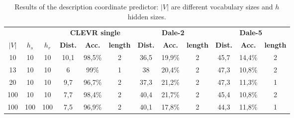 \begin{table}[h]
    \centering
    \begin{tabular}{ccc|ccc|ccc|ccc}
        \toprule
              &         &         & \multicolumn{3}{c}{\textbf{CLEVR single}} & \multicolumn{3}{c}{\textbf{Dale-2}} & \multicolumn{3}{c}{\textbf{Dale-5}}                                                                                                       \\\cmidrule(lr){4-6}\cmidrule(lr){7-9}\cmidrule(lr){10-12}
        $|V|$ & $h_{s}$ & $h_{r}$ & \textbf{Dist.}                            & \textbf{Acc.}                       & \textbf{length}                     & \textbf{Dist.} & \textbf{Acc.} & \textbf{length} & \textbf{Dist.} & \textbf{Acc.} & \textbf{length} \\\midrule
        {10}  & {10}    & {10}    & {10,1}                                    & {98,5\%}                            & {2}                                 & {36,5}         & {19,9\%}      & {2}             & {45,7}         & {14,4\%}      & {2}             \\
        {13}  & {10}    & {10}    & {6}                                       & {99\%}                              & {1}                                 & {38}           & {20,4\%}      & {2}             & {47,3}         & {10,8\%}      & {2}             \\
        {20}  & {10}    & {10}    & {9,7}                                     & {96,7\%}                            & {2}                                 & {37,3}         & {21,2\%}      & {2}             & {47,3}         & {11,3\%}      & {1}             \\
        {100} & {10}    & {10}    & {7,7}                                     & {98,4\%}                            & {2}                                 & {40,4}         & {21,7\%}      & {2}             & {45,4}         & {10,8\%}      & {2}             \\
        {100} & {100}   & {100}   & {7,5}                                     & {96,9\%}                            & {2}                                 & {40,1}         & {17,8\%}      & {2}             & {44,3}         & {11,8\%}      & {1}             \\
        \bottomrule
    \end{tabular}
    \caption{Results of the description coordinate predictor: $|V|$ are different vocabulary sizes and $h$ hidden sizes.}
    \label{tab:results_dale_predictor_game}
\end{table}

